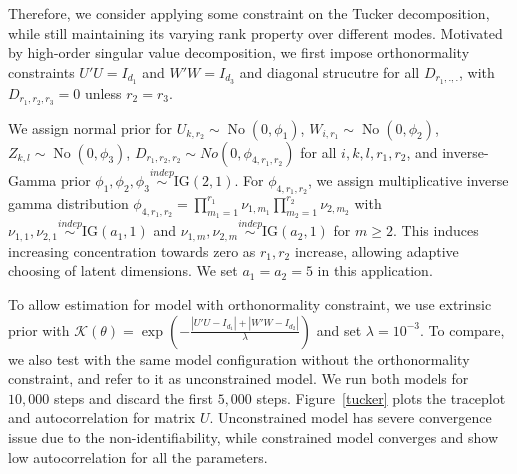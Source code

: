\documentclass[10pt]{article}
\newcommand{\mc}[1]{\mathcal{#1}}
\DeclareMathOperator{\No}{No}
\DeclareMathOperator{\1}{\mathbbm{1}}
\begin{document}
Therefore, we consider applying some constraint on the Tucker decomposition, while still maintaining its varying rank property over different modes. Motivated by high-order singular value decomposition, we first impose orthonormality constraints $U'U=I_{d_1}$ and $W'W=I_{d_3}$ and diagonal strucutre for all $D_{r_1,.,.}$, with $D_{r_1,r_2,r_3}=0$ unless $r_2=r_3$.

We assign normal prior for $U_{k,r_2}\sim \No(0,\phi_{1})$, $W_{i,r_1}\sim \No(0,\phi_2)$, $Z_{k,l}\sim \No(0,\phi_3)$, $D_{r_1,r_2,r_2}\sim No(0, \phi_{4,r_1,r_2})$ for all $i,k,l,r_1,r_2$, and inverse-Gamma prior $\phi_1,\phi_2,\phi_3\stackrel{indep}{\sim} \text{IG}(2,1)$. For $\phi_{4,r_1,r_2}$, we assign multiplicative inverse gamma distribution \citep{bhattacharya2011sparse} $\phi_{4,r_1,r_2}= \prod_{m_1=1}^{r_1} \nu_{1,m_1} \prod_{m_2=1}^{r_2}  \nu_{2,m_2}$ with $\nu_{1,1},\nu_{2,1} \stackrel{indep}{\sim} \text{IG}(a_1,1)$ and $\nu_{1,m},\nu_{2,m}\stackrel{indep}{\sim} \text{IG}(a_2,1)$ for $m\ge 2$. This induces increasing concentration towards
zero as $r_1,r_2$ increase, allowing adaptive choosing of latent dimensions. We set $a_1=a_2=5$ in this application.

To allow estimation for model with orthonormality constraint, we use extrinsic prior with $\mc K(\theta) = \exp( - \frac{|U'U-I_{d_1}| + |W'W-I_{d_2}|  }{\lambda})$ and set $\lambda=10^{-3}$. To compare, we also test with the same model configuration without the orthonormality constraint, and refer to it as unconstrained model. We run both models for $10,000$ steps and discard the first $5,000$ steps. Figure~\ref{tucker} plots the traceplot and autocorrelation for matrix $U$. Unconstrained model has severe convergence issue due to the non-identifiability, while constrained model converges and show low autocorrelation for all the parameters.
\end{document}
